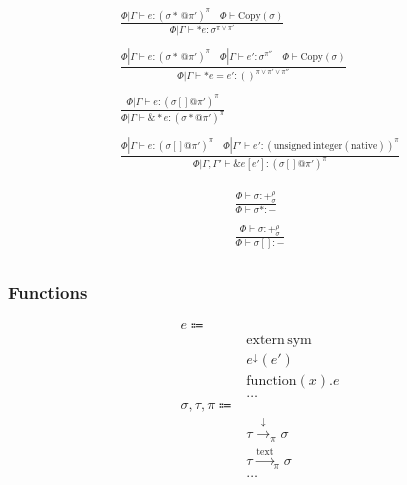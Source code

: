 \documentclass {article}
\begin{document}
\begin{gather*}
\frac
{\Phi | \Gamma \vdash e : (\sigma* \, @ \pi')^\pi \quad \Phi \vdash \text{Copy} (\sigma)}
{\Phi | \Gamma \vdash * e  : \sigma^{\pi \lor \pi'}} \\
\\
\frac
{\Phi | \Gamma \vdash e : (\sigma* \, @ \pi')^\pi \quad \Phi | \Gamma \vdash e' : \sigma^{\pi''}  \quad \Phi \vdash \text{Copy} (\sigma)}
{\Phi | \Gamma \vdash *e  = e' : ()^{\pi \lor \pi' \lor \pi''} } \\
\\
\frac
{\Phi | \Gamma \vdash e : (\sigma[] @ \pi') ^ \pi}
{\Phi | \Gamma \vdash \& * e : (\sigma * @ \pi') ^ \pi}\\
\\
\frac
{\Phi | \Gamma \vdash e : (\sigma [] @ \pi')^\pi \quad \Phi |
 \Gamma' \vdash e' : (\text{unsigned} \, \text{integer}(\text{native}))^\pi}
{\Phi | \Gamma, \Gamma' \vdash \&e [e'] : (\sigma [] @  \pi')^\pi}
\end{gather*}

\begin{gather*}
\frac
{\Phi \vdash \sigma : +^{\rho}_\sigma}
{\Phi \vdash \sigma* : -} \\
\\
\frac
{\Phi \vdash \sigma : +^{\rho}_\sigma}
{\Phi \vdash \sigma [] : -} \\
\end{gather*}

\subsubsection{Functions}

\begin{align*}
e \Coloneqq & \\
& \text{extern} \, \text{sym} \tag{Extern Function} \\
& e ^\downarrow (e') \tag{Function Pointer Application} \\
& \text{function} (x). e \tag{Function Literal} \\
& \dots \\
\sigma, \tau, \pi \Coloneqq & \\
& \tau \xrightarrow{\downarrow}_\pi \sigma \tag{Function Pointer}\\
& \tau \xrightarrow{\text{text}}_\pi \sigma  \tag{Function Literal Type} \\
& \dots
\end{align*}
\end{document}
